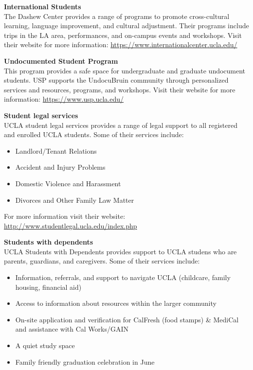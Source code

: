 \documentclass[11pt,]{article}
\providecommand{\tightlist}{%
  \setlength{\itemsep}{0pt}\setlength{\parskip}{0pt}}
\begin{document}
\textbf{International Students}\\
The Dashew Center provides a range of programs to promote cross-cultural
learning, language improvement, and cultural adjustment. Their programs
include trips in the LA area, performances, and on-campus events and
workshops. Visit their website for more information:
\url{https://www.internationalcenter.ucla.edu/}

\textbf{Undocumented Student Program}\\
This program provides a safe space for undergraduate and graduate
undocument students. USP supports the UndocuBruin community through
personalized services and resources, programs, and workshops. Visit
their website for more information: \url{https://www.usp.ucla.edu/}

\textbf{Student legal services}\\
UCLA student legal services provides a range of legal support to all
registered and enrolled UCLA students. Some of their services include:

\begin{itemize}
\tightlist
\item
  Landlord/Tenant Relations\\
\item
  Accident and Injury Problems\\
\item
  Domestic Violence and Harassment\\
\item
  Divorces and Other Family Law Matter
\end{itemize}

For more information visit their website:
\url{http://www.studentlegal.ucla.edu/index.php}

\textbf{Students with dependents}\\
UCLA Students with Dependents provides support to UCLA studens who are
parents, guardians, and caregivers. Some of their services include:

\begin{itemize}
\tightlist
\item
  Information, referrals, and support to navigate UCLA (childcare,
  family housing, financial aid)\\
\item
  Access to information about resources within the larger community\\
\item
  On-site application and verification for CalFresh (food stamps) \&
  MediCal and assistance with Cal Works/GAIN\\
\item
  A quiet study space\\
\item
  Family friendly graduation celebration in June
\end{itemize}
\end{document}
